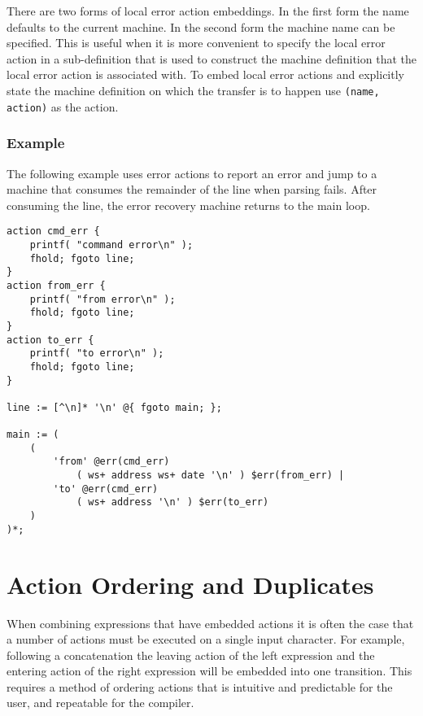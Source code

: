 \documentclass[letterpaper,11pt,oneside]{book}
\newcommand{\verbspace}{\vspace{10pt}}
\newenvironment{inline_code}{\def\baselinestretch{1}\vspace{12pt}\small}{}
\begin{document}
There are two forms of local error action embeddings. In the first form the
name defaults to the current machine. In the second form the machine name can
be specified.  This is useful when it is more convenient to specify the local
error action in a sub-definition that is used to construct the machine
definition that the local error action is associated with. To embed local 
error actions and
explicitly state the machine definition on which the transfer is to happen use
\verb|(name, action)| as the action.

\subsubsection{Example}

The following example uses error actions to report an error and jump to a
machine that consumes the remainder of the line when parsing fails. After
consuming the line, the error recovery machine returns to the main loop.

\begin{inline_code}
\begin{verbatim}
action cmd_err { 
    printf( "command error\n" ); 
    fhold; fgoto line;
}
action from_err { 
    printf( "from error\n" ); 
    fhold; fgoto line; 
}
action to_err { 
    printf( "to error\n" ); 
    fhold; fgoto line;
}

line := [^\n]* '\n' @{ fgoto main; };

main := (
    (
        'from' @err(cmd_err) 
            ( ws+ address ws+ date '\n' ) $err(from_err) |
        'to' @err(cmd_err)
            ( ws+ address '\n' ) $err(to_err)
    ) 
)*;
\end{verbatim}
\end{inline_code}
\verbspace
% }%%
% %% write data;
% void f()
% {
%   %% write init;
%   %% write exec;
% }
% END GENERATE



\section{Action Ordering and Duplicates}

When combining expressions that have embedded actions it is often the case that
a number of actions must be executed on a single input character. For example,
following a concatenation the leaving action of the left expression and the
entering action of the right expression will be embedded into one transition.
This requires a method of ordering actions that is intuitive and
predictable for the user, and repeatable for the compiler. 
\end{document}
